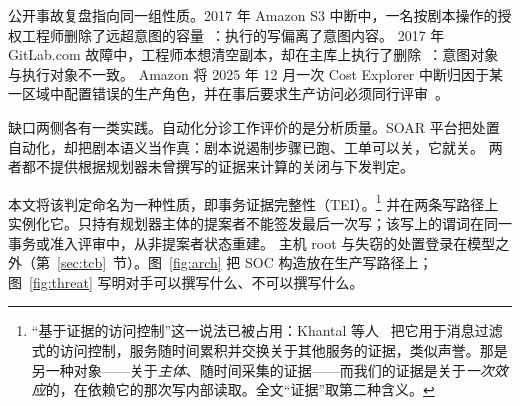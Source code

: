 \documentclass[acmsmall,manuscript,review,anonymous]{acmart}
\renewcommand{\_}{\discretionary{\textunderscore}{}{\textunderscore}}
\begin{document}
公开事故复盘指向同一组性质。2017 年 {Amazon S3} 中断中，一名按剧本操作的授权工程师删除了远超意图的容量~\cite{aws2017s3}：执行的写偏离了意图内容。
2017 年 {GitLab.com} 故障中，工程师本想清空副本，却在主库上执行了删除~\cite{gitlab2017db}：意图对象与执行对象不一致。
{Amazon} 将 2025 年 12 月一次 {Cost Explorer} 中断归因于某一区域中配置错误的生产角色，并在事后要求生产访问必须同行评审~\cite{amazon2026kiro}。

缺口两侧各有一类实践。自动化分诊工作评价的是分析质量。{SOAR} 平台把处置自动化，却把剧本语义当作真：剧本说遏制步骤已跑、工单可以关，它就关。
两者都不提供根据规划器未曾撰写的证据来计算的关闭与下发判定。

本文将该判定命名为一种性质，即事务证据完整性（TEI）。\footnote{“基于证据的访问控制”这一说法已被占用：Khantal 等人~\cite{khantal2008evidence} 把它用于消息过滤式的访问控制，服务随时间累积并交换关于其他服务的证据，类似声誉。那是另一种对象——关于\emph{主体}、随时间采集的证据——而我们的证据是关于\emph{一次效应}的，在依赖它的那次写内部读取。全文“证据”取第二种含义。}
并在两条写路径上实例化它。只持有规划器主体的提案者不能签发最后一次写；该写上的谓词在同一事务或准入评审中，从非提案者状态重建。
主机 root 与失窃的处置登录在模型之外（第~\ref{sec:tcb}~节）。图~\ref{fig:arch} 把 {SOC} 构造放在生产写路径上；图~\ref{fig:threat} 写明对手可以撰写什么、不可以撰写什么。
\end{document}
